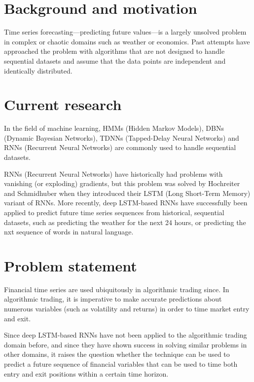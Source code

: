 \section{Background and motivation}
Time series forecasting---predicting future values---is a largely unsolved problem in complex or chaotic domains such as weather or economics. Past attempts have approached the problem with algorithms that are not designed to handle sequential datasets and assume that the data points are independent and identically distributed.

\section{Current research}
In the field of machine learning, HMMs (Hidden Markov Models), DBNs (Dynamic Bayesian Networks), TDNNs (Tapped-Delay Neural Networks) and RNNs (Recurrent Neural Networks) are commonly used to handle sequential datasets.

RNNs (Recurrent Neural Networks) have historically had problems with vanishing (or exploding) gradients, but this problem was solved by Hochreiter and Schmidhuber when they introduced their LSTM (Long Short-Term Memory) variant of RNNs.  More recently, deep LSTM-based RNNs have successfully been applied to predict future time series sequences from historical, sequential datasets, such as predicting the weather for the next 24 hours, or predicting the nxt sequence of words in natural language.

\section{Problem statement}
Financial time series are used ubiquitously in algorithmic trading since. In algorithmic trading, it is imperative to make accurate predictions about numerous variables (such as volatility and returns) in order to time market entry and exit.

Since deep LSTM-based RNNs have not been applied to the algorithmic trading domain before, and since they have shown success in solving similar problems in other domains, it raises the question whether the technique can be used to predict a future sequence of financial variables that can be used to time both entry and exit positions within a certain time horizon.
